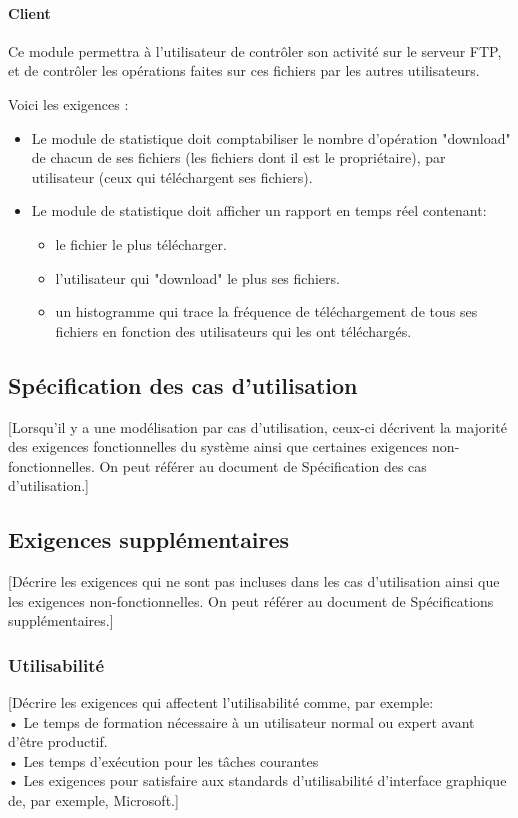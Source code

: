 \documentclass[10pt,a4paper]{report}
\begin{document}
\paragraph{\textbf{Client\\}}

Ce module permettra à l'utilisateur de contrôler son activité sur le serveur FTP, et de contrôler les opérations faites sur ces fichiers par les autres utilisateurs.

Voici les exigences :
\begin{itemize}[label = $\triangleright$]
\item Le module de statistique doit comptabiliser le nombre d'opération "download" de chacun de ses fichiers (les fichiers dont il est le propriétaire), par utilisateur (ceux qui téléchargent ses fichiers).
\item Le module de statistique doit afficher un rapport en temps réel contenant: 

\begin{itemize}
\item le fichier le plus télécharger.

\item l'utilisateur qui "download" le plus ses fichiers.

\item un histogramme qui trace la fréquence de téléchargement de tous ses fichiers en fonction des utilisateurs qui les ont téléchargés.
\end{itemize} 
\end{itemize}


\subsection{Spécification des cas d’utilisation}
[Lorsqu’il y a une modélisation par cas d’utilisation, ceux-ci décrivent la majorité des exigences fonctionnelles du système ainsi que certaines exigences non-fonctionnelles. On peut référer au document de Spécification des cas d’utilisation.]

\subsection{Exigences supplémentaires}
[Décrire les exigences qui ne sont pas incluses dans les cas d’utilisation ainsi que les exigences non-fonctionnelles. On peut référer au document de Spécifications supplémentaires.]

\subsubsection{Utilisabilité}
[Décrire les exigences qui affectent l’utilisabilité comme, par exemple:\\
•	Le temps de formation nécessaire à un utilisateur normal ou expert avant d’être productif.\\
•	Les temps d’exécution pour les tâches courantes\\
•	Les exigences pour satisfaire aux standards d’utilisabilité d’interface graphique de, par exemple, Microsoft.]
\end{document}
